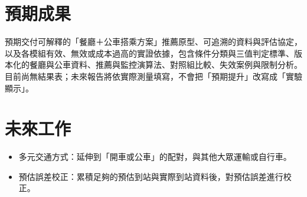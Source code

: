 \section{預期成果}

預期交付可解釋的「餐廳＋公車搭乘方案」推薦原型、可追溯的資料與評估協定，以及各模組有效、無效或成本過高的實證依據，包含條件分類與三值判定標準、版本化的餐廳與公車資料、推薦與監控演算法、對照組比較、失效案例與限制分析。目前尚無結果表；未來報告將依實際測量填寫，不會把「預期提升」改寫成「實驗顯示」。


\section{未來工作}

\begin{itemize}
\item 多元交通方式：延伸到「開車或公車」的配對，與其他大眾運輸或自行車。
\item 預估誤差校正：累積足夠的預估到站與實際到站資料後，對預估誤差進行校正。
\end{itemize}
